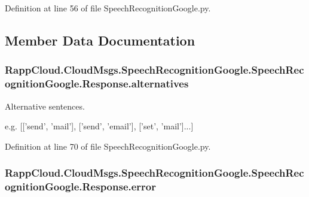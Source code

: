 Definition at line 56 of file Speech\-Recognition\-Google.\-py.



\subsection{Member Data Documentation}
\hypertarget{classRappCloud_1_1CloudMsgs_1_1SpeechRecognitionGoogle_1_1SpeechRecognitionGoogle_1_1Response_ade7fad0b7524d84c3eeefc9767ea1d3d}{
\subsubsection[{alternatives}]{\setlength{\rightskip}{0pt plus 5cm}Rapp\-Cloud.\-Cloud\-Msgs.\-Speech\-Recognition\-Google.\-Speech\-Recognition\-Google.\-Response.\-alternatives}}\label{classRappCloud_1_1CloudMsgs_1_1SpeechRecognitionGoogle_1_1SpeechRecognitionGoogle_1_1Response_ade7fad0b7524d84c3eeefc9767ea1d3d}


Alternative sentences. 

e.\-g. \mbox{[}\mbox{[}'send', 'mail'\mbox{]}, \mbox{[}'send', 'email'\mbox{]}, \mbox{[}'set', 'mail'\mbox{]}...\mbox{]} 

Definition at line 70 of file Speech\-Recognition\-Google.\-py.

\hypertarget{classRappCloud_1_1CloudMsgs_1_1SpeechRecognitionGoogle_1_1SpeechRecognitionGoogle_1_1Response_a6b32c2163c5a93ee915e6c4f4a261b8a}{
\subsubsection[{error}]{\setlength{\rightskip}{0pt plus 5cm}Rapp\-Cloud.\-Cloud\-Msgs.\-Speech\-Recognition\-Google.\-Speech\-Recognition\-Google.\-Response.\-error}}\label{classRappCloud_1_1CloudMsgs_1_1SpeechRecognitionGoogle_1_1SpeechRecognitionGoogle_1_1Response_a6b32c2163c5a93ee915e6c4f4a261b8a}


